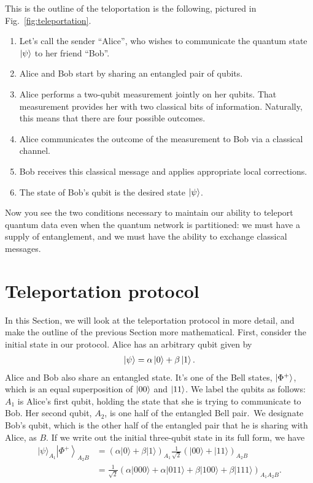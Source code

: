 This is the outline of the teloportation is the following, pictured in Fig.~\ref{fig:teleportation}.
\begin{enumerate}
    \item Let's call the sender ``Alice'', who wishes to communicate the quantum state $\left| \psi \right\rangle$ to her friend ``Bob''.
    \item Alice and Bob start by sharing an entangled pair of qubits.
    \item Alice performs a two-qubit measurement jointly on her qubits. That measurement provides her with two classical bits of information.
    Naturally, this means that there are four possible outcomes.
    \item Alice communicates the outcome of the measurement to Bob via a classical channel.
    \item Bob receives this classical message and applies appropriate local corrections.
    \item The state of Bob's qubit is the desired state $\left| \psi \right\rangle$.
\end{enumerate} 

Now you see the two conditions necessary to maintain our ability to teleport quantum data even when the quantum network is partitioned: we must have a supply of entanglement, and we must have the ability to exchange classical messages.



\section{Teleportation protocol}
\label{sec:8-2_teleportation_protocol}

In this Section, we will look at the teleportation protocol in more detail, and make the outline of the previous Section more mathematical.
First, consider the initial state in our protocol.
Alice has an arbitrary qubit given by
\begin{align}
    \left| \psi \right\rangle = \alpha\left| 0 \right\rangle + \beta\left| 1 \right\rangle.
\end{align}
Alice and Bob also share an entangled state.
It's one of the Bell states, $\left| \Phi^+ \right\rangle$, which is an equal superposition of $\left| 00 \right\rangle$ and $\left| 11 \right\rangle$.
We label the qubits as follows: $A_1$ is Alice's first qubit, holding the state that she is trying to communicate to Bob. 
Her second qubit, $A_2$, is one half of the entangled Bell pair.\
We designate Bob's qubit, which is the other half of the entangled pair that he is sharing with Alice, as $B$.
If we write out the initial three-qubit state in its full form, we have
\begin{align}
    |\psi\rangle_{A_{1}}\left|\Phi^{+}\right\rangle_{A_{2} B} &=(\alpha|0\rangle+\beta|1\rangle)_{A_{1}} \frac{1}{\sqrt{2}}(|00\rangle+|11\rangle)_{A_{2} B} \nonumber\\
    &=\frac{1}{\sqrt{2}}(\alpha|000\rangle+\alpha|011\rangle+\beta|100\rangle+\beta|111\rangle)_{A_{1} A_{2} B}.
    \label{eq:teleportation_initial_state}
\end{align}

